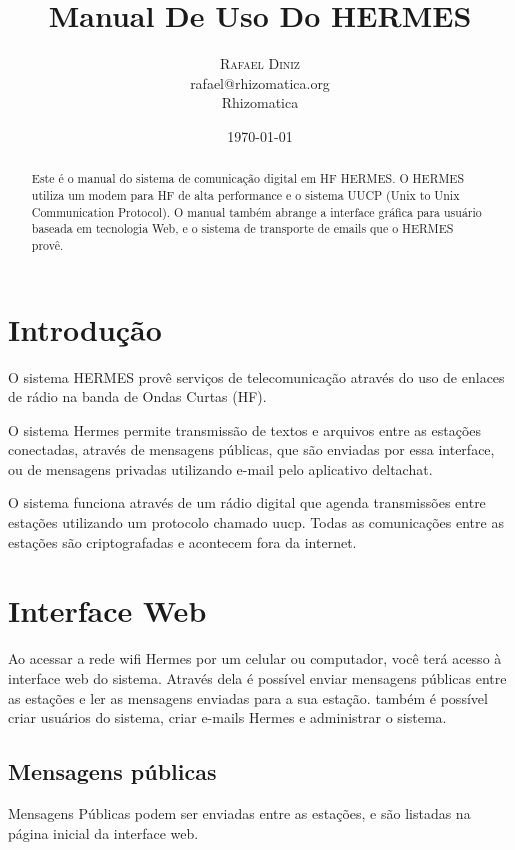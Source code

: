 \documentclass[11pt,a4paper]{article}
\title{Manual De Uso Do HERMES}
\author{
       \large
        \textsc{Rafael Diniz}
        \mbox{}\\ %
        rafael@rhizomatica.org\\
        \mbox{Rhizomatica} \\ %
}
\date{\today}
\begin{document}
\maketitle

\begin{abstract}
Este é o manual do sistema de comunicação digital em HF HERMES. O HERMES utiliza um modem para HF de alta performance e o sistema UUCP (Unix to Unix Communication Protocol). O manual também abrange a interface gráfica para usuário baseada em tecnologia Web, e o sistema de transporte de emails que o HERMES provê.


\end{abstract}

\newpage

\tableofcontents

\section{Introdução}

O sistema HERMES provê serviços de telecomunicação através do uso de enlaces de rádio na banda de Ondas Curtas (HF).

O sistema Hermes permite transmissão de textos e arquivos entre as estações conectadas, através de mensagens públicas, que são enviadas por essa interface, ou de mensagens privadas utilizando e-mail pelo aplicativo deltachat. 

O sistema funciona através de um rádio digital que agenda transmissões entre estações utilizando um protocolo chamado uucp. Todas as comunicações entre as estações são criptografadas e acontecem fora da internet.

\section{Interface Web}

Ao acessar a rede wifi Hermes por um celular ou computador, você terá acesso à interface web do sistema. Através dela é possível enviar mensagens públicas entre as estações e ler as mensagens enviadas para a sua estação. também é possível criar usuários do sistema, criar e-mails Hermes e administrar o sistema.


\subsection{Mensagens públicas}
Mensagens Públicas podem ser enviadas entre as estações, e são listadas na página inicial da interface web. 
\end{document}
